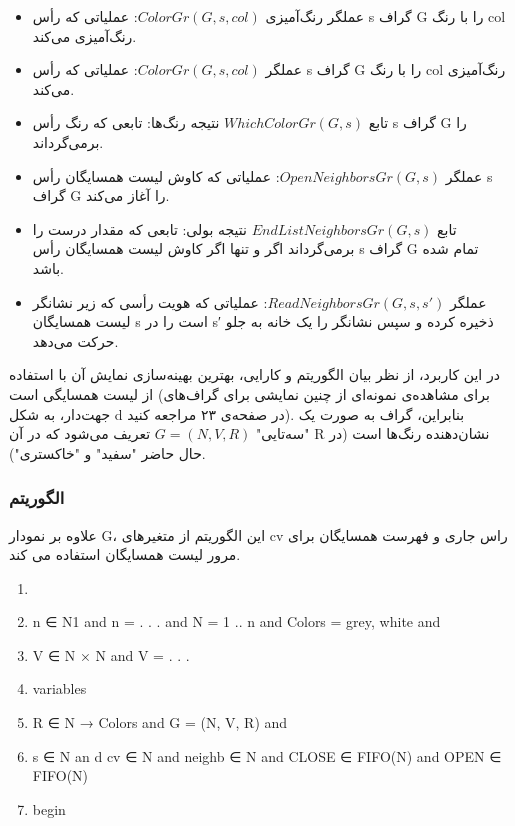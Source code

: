 \documentclass{book} %
\begin{document}
\begin{itemize}
    \item عملگر رنگ‌آمیزی‌ $ColorGr(G, s, col)$: عملیاتی که رأس s گراف G را با رنگ col رنگ‌آمیزی می‌کند.
   
    \item عملگر $ColorGr(G, s, col)$: عملیاتی که رأس s گراف G را با رنگ col رنگ‌آمیزی می‌کند.
    \item تابع $WhichColorGr(G, s)$ نتیجه رنگ‌ها: تابعی که رنگ رأس s گراف G را برمی‌گرداند.
    \item عملگر $OpenNeighborsGr(G, s)$: عملیاتی که کاوش لیست همسایگان رأس s گراف G را آغاز می‌کند.
    \item تابع $EndListNeighborsGr(G, s)$ نتیجه بولی: تابعی که مقدار درست را برمی‌گرداند اگر و تنها اگر کاوش لیست همسایگان رأس s گراف G تمام شده باشد.
    \item عملگر $ReadNeighborsGr(G, s, s′)$: عملیاتی که هویت رأسی که زیر نشانگر لیست همسایگان s است را در s′ ذخیره کرده و سپس نشانگر را یک خانه به جلو حرکت می‌دهد.
    
\end{itemize}

در این کاربرد، از نظر بیان الگوریتم و کارایی، بهترین بهینه‌سازی نمایش آن با استفاده از لیست همسایگی است (برای مشاهده‌ی نمونه‌ای از چنین نمایشی برای گراف‌های جهت‌دار، به شکل d در صفحه‌ی ۲۳ مراجعه کنید). بنابراین، گراف به صورت یک "سه‌تایی" $G = (N, V, R)$ تعریف می‌شود که در آن R نشان‌دهنده رنگ‌ها است (در حال حاضر "سفید" و "خاکستری").

\subsubsection*{الگوریتم}

علاوه بر نمودار G، این الگوریتم از متغیرهای cv راس جاری و فهرست همسایگان برای مرور لیست همسایگان استفاده می کند.

\begin{latin}
    
    \begin{enumerate}
        
        \item 
        \item n ∈ N1 and n = . . . and N = 1 .. n and Colors = {grey, white} and
        \item V ∈ N × N and V = {. . .}
        \item variables
        \item R ∈ N → Colors and G = (N, V, R) and
        \item s ∈ N an d cv ∈ N and neighb ∈ N and CLOSE ∈ FIFO(N) and OPEN ∈ FIFO(N)
        \item begin
        
        
    \end{enumerate}
    
\end{latin}
\end{document}
